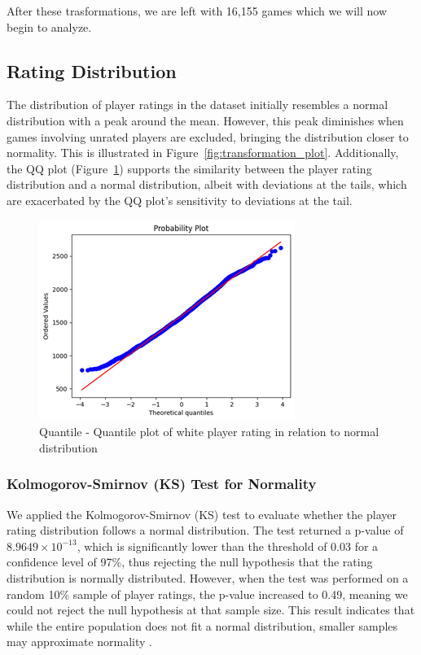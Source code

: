 \documentclass[conference]{IEEEtran}
\begin{document}
After these trasformations, we are left with 16,155 games which we will now begin to analyze.

\subsection{Rating Distribution}
The distribution of player ratings in the dataset initially resembles a normal distribution with a peak around the mean. However, this peak diminishes when games involving unrated players are excluded, bringing the distribution closer to normality. This is illustrated in Figure~\ref{fig:transformation_plot}. Additionally, the QQ plot (Figure~\ref{fig:rating_qq}) supports the similarity between the player rating distribution and a normal distribution, albeit with deviations at the tails, which are exacerbated by the QQ plot's sensitivity to deviations at the tail.

\begin{figure}[H]
    \centering
    \includegraphics[width=0.8\linewidth]{ratingqq.png}
    \caption{Quantile - Quantile plot of white player rating in relation to normal distribution}
    \label{fig:rating_qq}
\end{figure}


\subsubsection*{Kolmogorov-Smirnov (KS) Test for Normality}
We applied the Kolmogorov-Smirnov (KS) test to evaluate whether the player rating distribution follows a normal distribution. The test returned a p-value of \(8.9649 \times 10^{-13}\), which is significantly lower than the threshold of \(0.03\) for a confidence level of 97\%, thus rejecting the null hypothesis that the rating distribution is normally distributed. However, when the test was performed on a random 10\% sample of player ratings, the p-value increased to 0.49, meaning we could not reject the null hypothesis at that sample size. This result indicates that while the entire population does not fit a normal distribution, smaller samples may approximate normality \cite{kssample}.
\end{document}
